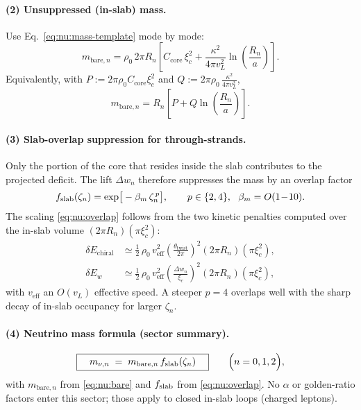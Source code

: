 \paragraph{(2) Unsuppressed (in-slab) mass.}
Use Eq.~\eqref{eq:nu:mass-template} mode by mode:
\begin{equation}
\label{eq:nu:bare}
m_{\text{bare},n}
=\rho_0\,2\pi R_n
\left[C_{\mathrm{core}}\,\xi_c^2
+\frac{\kappa^2}{4\pi v_L^2}\ln\!\left(\frac{R_n}{a}\right)\right].
\end{equation}
Equivalently, with $P:=2\pi\rho_0 C_{\mathrm{core}}\xi_c^2$ and $Q:=2\pi\rho_0\,\frac{\kappa^2}{4\pi v_L^2}$,
\begin{equation}
m_{\text{bare},n}=R_n\left[P+Q\ln\!\left(\frac{R_n}{a}\right)\right].
\end{equation}

\paragraph{(3) Slab-overlap suppression for through-strands.}
Only the portion of the core that resides inside the slab contributes to the projected deficit. The lift $\Delta w_n$ therefore suppresses the mass by an overlap factor
\begin{equation}
\label{eq:nu:overlap}
f_{\rm slab}(\zeta_n)=\exp\!\big[-\beta_m\,\zeta_n^{\,p}\big],
\qquad p\in\{2,4\},\ \ \beta_m=O(1\!-\!10).
\end{equation}
The scaling \eqref{eq:nu:overlap} follows from the two kinetic penalties computed over the in-slab volume $(2\pi R_n)(\pi\xi_c^2)$:
\begin{align}
\delta E_{\mathrm{chiral}} &\simeq \tfrac{1}{2}\,\rho_0\,v_{\mathrm{eff}}^2
\left(\frac{\theta_{\mathrm{twist}}}{2\pi}\right)^{\!2} (2\pi R_n)(\pi\xi_c^2),\\
\delta E_{w} &\simeq \tfrac{1}{2}\,\rho_0\,v_{\mathrm{eff}}^2
\left(\frac{\Delta w_n}{\xi_c}\right)^{\!2} (2\pi R_n)(\pi\xi_c^2),
\end{align}
with $v_{\mathrm{eff}}$ an $O(v_L)$ effective speed. A steeper $p=4$ overlaps well with the sharp decay of in-slab occupancy for larger $\zeta_n$.

\paragraph{(4) Neutrino mass formula (sector summary).}
\begin{equation}
\label{eq:nu:fullmass}
\boxed{\quad m_{\nu,n}\;=\;m_{\text{bare},n}\,f_{\rm slab}(\zeta_n)\quad}
\qquad
\Big(n=0,1,2\Big),
\end{equation}
with $m_{\text{bare},n}$ from \eqref{eq:nu:bare} and $f_{\rm slab}$ from \eqref{eq:nu:overlap}. No $\alpha$ or golden-ratio factors enter this sector; those apply to closed in-slab loops (charged leptons).

